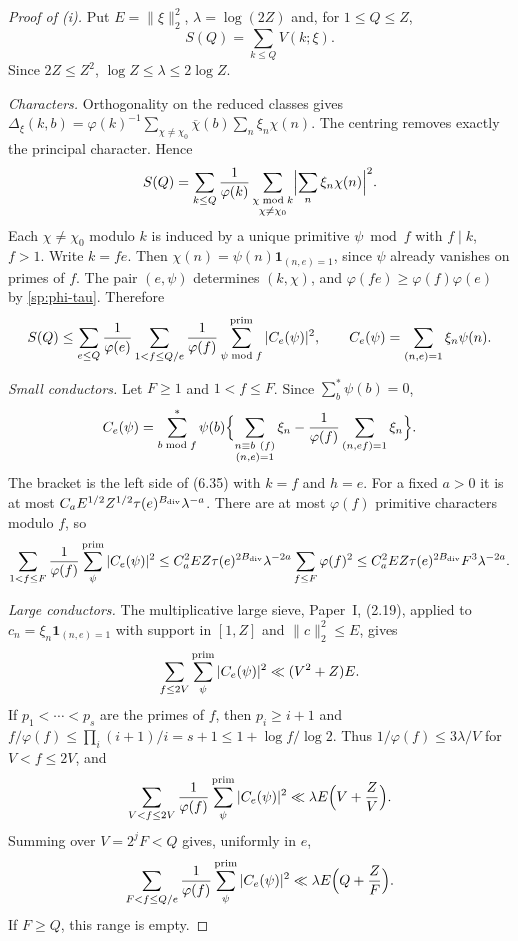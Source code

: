 \begin{proof}[Proof of \textup{(i)}]
Put $E=\|\xi\|_2^2$, $\lambda=\log(2Z)$ and, for $1\le Q\le Z$,
\[
 S(Q)=\sum_{k\le Q}V(k;\xi).
\]
Since $2Z\le Z^2$, $\log Z\le\lambda\le2\log Z$.

\emph{Characters.} Orthogonality on the reduced classes gives
$\Delta_\xi(k,b)=\varphi(k)^{-1}\sum_{\chi\ne\chi_0}\overline{\chi}(b)
\sum_n\xi_n\chi(n)$. The centring removes exactly the principal character.
Hence
\begin{equation}\label{sp:parseval}
 S(Q)=\sum_{k\le Q}\frac1{\varphi(k)}\sum_{\substack{\chi\bmod k\\\chi\ne\chi_0}}
       \Bigl|\sum_n\xi_n\chi(n)\Bigr|^2 .
\end{equation}
Each $\chi\ne\chi_0$ modulo $k$ is induced by a unique primitive
$\psi\bmod f$ with $f\mid k$, $f>1$. Write $k=fe$. Then
$\chi(n)=\psi(n)\mathbf1_{(n,e)=1}$, since $\psi$ already vanishes on
primes of $f$. The pair $(e,\psi)$ determines $(k,\chi)$, and
$\varphi(fe)\ge\varphi(f)\varphi(e)$ by \eqref{sp:phi-tau}. Therefore
\begin{equation}\label{sp:primitive}
 S(Q)\le\sum_{e\le Q}\frac1{\varphi(e)}
 \sum_{1<f\le Q/e}\frac1{\varphi(f)}\sum_{\psi\bmod f}^{\rm prim}
 |C_e(\psi)|^2,\qquad
 C_e(\psi)=\sum_{(n,e)=1}\xi_n\psi(n).
\end{equation}

\emph{Small conductors.} Let $F\ge1$ and $1<f\le F$. Since
$\sum_{b}^{*}\psi(b)=0$,
\[
 C_e(\psi)=\sum_{b\bmod f}^{*}\psi(b)
 \Bigl\{\sum_{\substack{n\equiv b\ (f)\\(n,e)=1}}\xi_n
 -\frac1{\varphi(f)}\sum_{(n,ef)=1}\xi_n\Bigr\}.
\]
The bracket is the left side of (6.35) with $k=f$ and $h=e$. For a fixed
$a>0$ it is at most $C_aE^{1/2}Z^{1/2}\tau(e)^{B_{\rm div}}\lambda^{-a}$.
There are at most $\varphi(f)$ primitive characters modulo $f$, so
\begin{equation}\label{sp:small-cond}
 \sum_{1<f\le F}\frac1{\varphi(f)}\sum_\psi^{\rm prim}|C_e(\psi)|^2
 \le C_a^2EZ\tau(e)^{2B_{\rm div}}\lambda^{-2a}\sum_{f\le F}\varphi(f)^2
 \le C_a^2EZ\tau(e)^{2B_{\rm div}}F^3\lambda^{-2a}.
\end{equation}

\emph{Large conductors.} The multiplicative large sieve, Paper~I, (2.19),
applied to $c_n=\xi_n\mathbf1_{(n,e)=1}$ with support in $[1,Z]$ and
$\|c\|_2^2\le E$, gives
\[
 \sum_{f\le 2V}\sum_\psi^{\rm prim}|C_e(\psi)|^2\ll(V^2+Z)E .
\]
If $p_1<\cdots<p_s$ are the primes of $f$, then $p_i\ge i+1$ and
$f/\varphi(f)\le\prod_i(i+1)/i=s+1\le1+\log f/\log2$. Thus
$1/\varphi(f)\le3\lambda/V$ for $V<f\le2V$, and
\[
 \sum_{V<f\le2V}\frac1{\varphi(f)}\sum_\psi^{\rm prim}|C_e(\psi)|^2
 \ll\lambda E\Bigl(V+\frac ZV\Bigr).
\]
Summing over $V=2^jF<Q$ gives, uniformly in $e$,
\begin{equation}\label{sp:large-cond}
 \sum_{F<f\le Q/e}\frac1{\varphi(f)}\sum_\psi^{\rm prim}|C_e(\psi)|^2
 \ll\lambda E\Bigl(Q+\frac ZF\Bigr).
\end{equation}
If $F\ge Q$, this range is empty.


\end{proof}
